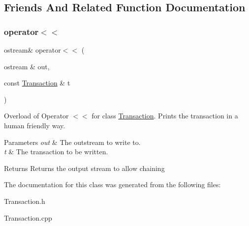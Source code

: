 \subsection{Friends And Related Function Documentation}
\hypertarget{class_transaction_a75af23fbc3b593013d411cf50c5a3a7a}{}\label{class_transaction_a75af23fbc3b593013d411cf50c5a3a7a} 
\subsubsection{\texorpdfstring{operator$<$$<$}{operator<<}}
{\footnotesize\ttfamily ostream\& operator$<$$<$ (\begin{DoxyParamCaption}\item[{ostream \&}]{out,  }\item[{const \hyperlink{class_transaction}{Transaction} \&}]{t }\end{DoxyParamCaption})\hspace{0.3cm}{\ttfamily [friend]}}

Overload of Operator $<$$<$ for class \hyperlink{class_transaction}{Transaction}. Prints the transaction in a human friendly way. 
\begin{DoxyParams}{Parameters}
{\em out} & The outstream to write to. \\
\hline
{\em t} & The transaction to be written. \\
\hline
\end{DoxyParams}
\begin{DoxyReturn}{Returns}
Returns the output stream to allow chaining 
\end{DoxyReturn}


The documentation for this class was generated from the following files\+:\begin{DoxyCompactItemize}
\item 
Transaction.\+h\item 
Transaction.\+cpp\end{DoxyCompactItemize}
